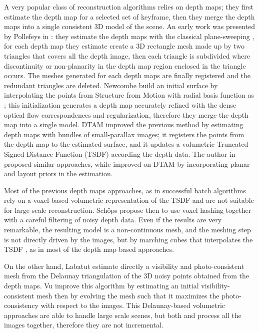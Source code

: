 A very popular class of reconstruction algorithms relies on depth maps; they first estimate the depth map for a selected set of keyframe, then they merge the depth maps into a single consistent 3D model of the scene. 
An early work was presented by Pollefeys \etal in \cite{pollefeys_et_al_08}: they estimate the depth maps with the classical plane-sweeping \cite{collins1996space}, for each depth map they estimate create a 3D rectangle mesh made up by two triangles that covers all the depth image, then each triangle is subdivided where discontinuity or non-planarity in the depth map region enclosed in the triangle occurs. The meshes generated for each depth maps are finally registered and the redundant triangles are deleted.
Newcombe \etal \cite{newcombe2010live} build an initial surface by interpolating the points from Structure from Motion with radial basis function as \cite{ohtake2003multi}; this initialization generates a depth map accurately refined with the dense optical flow correspondences and regularization, therefore they merge the depth map into a single model.
DTAM \cite{newcombe2011dtam} improved the previous method by estimating depth maps with bundles of small-parallax images; it registers the points from the depth map to the estimated surface, and it updates a volumetric Truncated Signed Distance Function (TSDF) according the depth data. 
The author in \cite{stuhmer2012parallel,stuckler2014multi} proposed similar approaches, while \cite{concha2015incorporating} improved on DTAM by incorporating planar and layout priors in the estimation. 


Most of the previous depth maps approaches, as in successful batch algorithms rely on a voxel-based volumetric representation of the TSDF and are not suitable for large-scale reconstruction. Sch{\"o}ps \etal \cite{schops20153d} propose then to use voxel hashing together with a careful filtering of noisy depth data.
Even if the results are very remarkable, the resulting model is a non-continuous mesh, and the meshing step is not directly driven by the images, but by marching cubes \cite{lorensen1987marching} that interpolates the TSDF , as in most of the depth map based approaches.


On the other hand, Labatut \etal \cite{labatut2007efficient} estimate directly a visibility and photo-consistent mesh from the Delaunay triangulation of the 3D noisy points obtained from the depth maps.
Vu \etal  \cite{vu_et_al_2012} improve this algorithm by estimating an initial visibility-consistent mesh then by evolving the mesh such that it maximizes the photo-consistency with respect to the images. 
This Delaunay-based volumetric approaches are able to handle large scale scenes, but both \cite{labatut2007efficient} and \cite{vu_et_al_2012} process all the images together, therefore they are not incremental.

